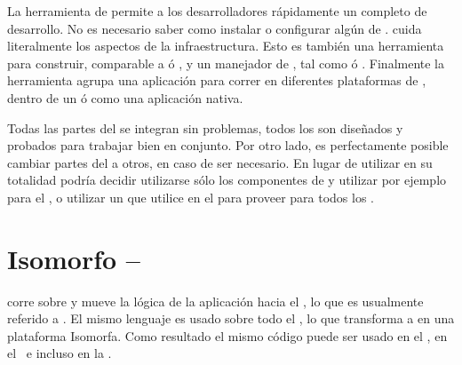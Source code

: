 La herramienta \clitool de \meteor permite a los desarrolladores rápidamente \setup un \environment completo de desarrollo. No es necesario saber como instalar o configurar algún \software de \server. \meteor cuida literalmente los aspectos de la infraestructura. Esto es también una herramienta para construir, comparable a \maketool ó \grunttool, y un manejador de \package, tal como \apttool ó \npm. Finalmente la herramienta \clitool agrupa una aplicación para correr en diferentes plataformas de \clients, dentro de un \browser \web ó como una aplicación \mobile nativa.

Todas las partes del \stack se integran sin problemas, todos los \packages \core son diseñados y probados para trabajar bien en conjunto. Por otro lado, es perfectamente posible cambiar partes del \stack a otros, en caso de ser necesario. En lugar de utilizar \meteor en su totalidad podría decidir utilizarse sólo los componentes de \server y utilizar por ejemplo \angularjs para el \clientside, o utilizar un \javabackend que utilice \meteor en el \frontend para proveer \updates \realtime para todos los \clients.

\section{\framework Isomorfo – \fullstack \javascript}

\meteor corre sobre \nodejs y mueve la lógica de la aplicación hacia el \browser, lo que es usualmente referido a \singlepageapp. El mismo lenguaje es usado sobre todo el \stack, lo que transforma a \meteor en una plataforma Isomorfa. Como resultado el mismo código \javascript puede ser usado en el \server, en el \client\, e incluso en la \database.

